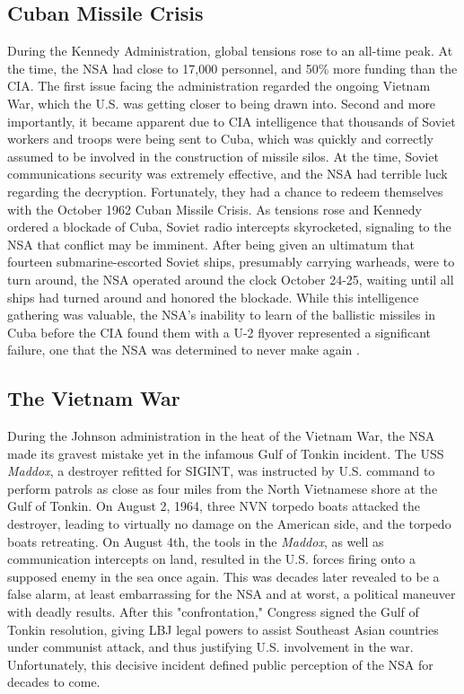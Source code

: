 \documentclass[12pt]{article}
\begin{document}
\subsection{Cuban Missile Crisis}

During the Kennedy Administration, global tensions rose to an all-time peak. At the time, the NSA had close to 17,000 personnel, and 50\% more funding than the CIA\cite{secret_sentry}. The first issue facing the administration regarded the ongoing Vietnam War, which the U.S. was getting closer to being drawn into. Second and more importantly, it became apparent due to CIA intelligence that thousands of Soviet workers and troops were being sent to Cuba, which was quickly and correctly assumed to be involved in the construction of missile silos\cite{cuban_missile}. At the time, Soviet communications security was extremely effective, and the NSA had terrible luck regarding the decryption. Fortunately, they had a chance to redeem themselves with the October 1962 Cuban Missile Crisis. As tensions rose and Kennedy ordered a blockade of Cuba, Soviet radio intercepts skyrocketed, signaling to the NSA that conflict may be imminent. After being given an ultimatum that fourteen submarine-escorted Soviet ships, presumably carrying warheads, were to turn around, the NSA operated around the clock October 24-25, waiting until all ships had turned around and honored the blockade. While this intelligence gathering was valuable, the NSA's inability to learn of the ballistic missiles in Cuba before the CIA found them with a U-2 flyover represented a significant failure, one that the NSA was determined to never make again \cite{cuban_chronology}. 

\subsection{The Vietnam War}

During the Johnson administration in the heat of the Vietnam War, the NSA made its gravest mistake yet in the infamous Gulf of Tonkin incident. The USS \textit{Maddox}, a destroyer refitted for SIGINT, was instructed by U.S. command to perform patrols as close as four miles from the North Vietnamese shore at the Gulf of Tonkin. On August 2, 1964, three NVN torpedo boats attacked the destroyer, leading to virtually no damage on the American side, and the torpedo boats retreating. On August 4th, the tools in the \textit{Maddox}, as well as communication intercepts on land, resulted in the U.S. forces firing onto a supposed enemy in the sea once again. This was decades later revealed to be a false alarm\cite{truth_about_tonkin}, at least embarrassing for the NSA and at worst, a political maneuver with deadly results. After this "confrontation," Congress signed the Gulf of Tonkin resolution, giving LBJ legal powers to assist Southeast Asian countries under communist attack, and thus justifying U.S. involvement in the war\cite{secret_sentry}. Unfortunately, this decisive incident defined public perception of the NSA for decades to come. 
\end{document}
